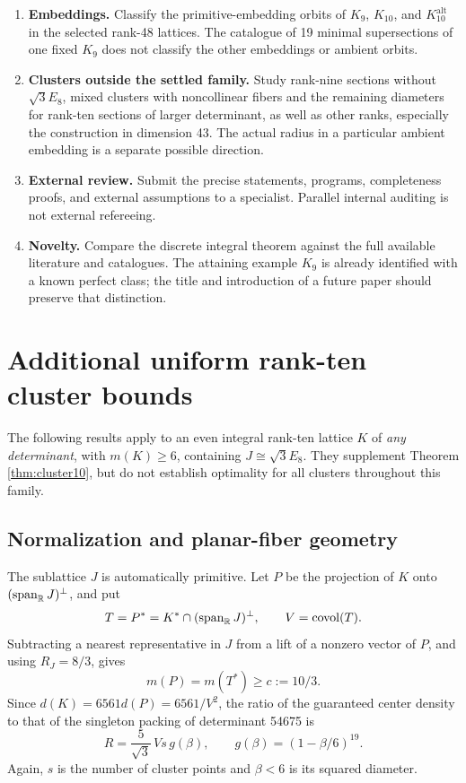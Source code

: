 \documentclass[11pt,a4paper]{article}
\theoremstyle{remark}\newtheorem{remark}[theorem]{Remark}
\newcommand{\spanR}{\operatorname{span}_{\R}}\newcommand{\diag}{\operatorname{diag}}
\newcommand{\Kalt}{K_{10}^{\mathrm{alt}}}
\begin{document}
\begin{enumerate}
\item \textbf{Embeddings.} Classify the primitive-embedding orbits of $K_9$, $K_{10}$, and $\Kalt$ in the selected rank-48 lattices. The catalogue of 19 minimal supersections of one fixed $K_9$ does not classify the other embeddings or ambient orbits.
\item \textbf{Clusters outside the settled family.} Study rank-nine sections without $\sqrt3E_8$, mixed clusters with noncollinear fibers and the remaining diameters for rank-ten sections of larger determinant, as well as other ranks, especially the construction in dimension 43. The actual radius in a particular ambient embedding is a separate possible direction.
\item \textbf{External review.} Submit the precise statements, programs, completeness proofs, and external assumptions to a specialist. Parallel internal auditing is not external refereeing.
\item \textbf{Novelty.} Compare the discrete integral theorem against the full available literature and catalogues. The attaining example $K_9$ is already identified with a known perfect class; the title and introduction of a future paper should preserve that distinction.
\end{enumerate}

\newpage
\appendix
\section{Additional uniform rank-ten cluster bounds}\label{app:uniform10}

The following results apply to an even integral rank-ten lattice $K$ of \emph{any determinant}, with $m(K)\ge6$, containing $J\cong\sqrt3E_8$. They supplement Theorem \ref{thm:cluster10}, but do not establish optimality for all clusters throughout this family.

\subsection{Normalization and planar-fiber geometry}

The sublattice $J$ is automatically primitive. Let $P$ be the projection of $K$ onto $(\spanR J)^\perp$, and put
\[
T=P^*=K^*\cap(\spanR J)^\perp,\qquad V=\operatorname{covol}(T).
\]
Subtracting a nearest representative in $J$ from a lift of a nonzero vector of $P$, and using $R_J=8/3$, gives
\[
m(P)=m(T^*)\ge c:=10/3.
\]
Since $d(K)=6561d(P)=6561/V^2$, the ratio of the guaranteed center density to that of the singleton packing of determinant 54675 is
\begin{equation}\label{eq:uniform10ratio}
R=\frac5{\sqrt3}\,V s\,g(\beta),\qquad
g(\beta)=(1-\beta/6)^{19}.
\end{equation}
Again, $s$ is the number of cluster points and $\beta<6$ is its squared diameter.
\end{document}
